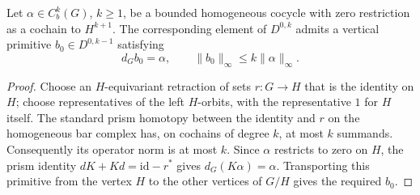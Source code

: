 \begin{lemma}\label{lem:relative-primitive}
Let $\alpha\in C_b^k(G)$, $k\geq1$, be a bounded
homogeneous cocycle with zero restriction as a cochain
to $H^{k+1}$. The corresponding element of
$D^{0,k}$ admits a vertical primitive $b_0\in
D^{0,k-1}$ satisfying
\[
 d_Gb_0=\alpha,\qquad
 \|b_0\|_\infty\leq k\|\alpha\|_\infty.
\]
\end{lemma}

\begin{proof}
Choose an $H$-equivariant retraction of sets
$r:G\to H$ that is the identity on $H$; choose
representatives of the left $H$-orbits, with the
representative $1$ for $H$ itself. The standard
prism homotopy between the identity and $r$ on
the homogeneous bar complex has, on cochains
of degree $k$, at most $k$ summands. Consequently
its operator norm is at most $k$.
Since $\alpha$ restricts to zero on $H$,
the prism identity $dK+Kd=\mathrm{id}-r^*$
gives $d_G(K\alpha)=\alpha$.
Transporting this primitive from the vertex $H$
to the other vertices of $G/H$ gives the
required $b_0$.
\end{proof}

